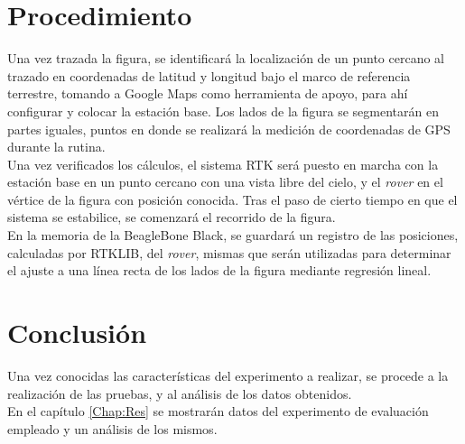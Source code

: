 \section{Procedimiento}

Una vez trazada la figura, se identificará la localización de un punto cercano al trazado en coordenadas de latitud y longitud bajo el marco de referencia terrestre, tomando a Google Maps como herramienta de apoyo, para ahí configurar y colocar la estación base. Los lados de la figura se segmentarán en partes iguales, puntos en donde se realizará la medición de coordenadas de GPS durante la rutina.\\

Una vez verificados los cálculos, el sistema RTK será puesto en marcha con la estación base en un punto cercano con una vista libre del cielo, y el \textit{rover} en el vértice de la figura con posición conocida. Tras el paso de cierto tiempo en que el sistema se estabilice, se comenzará el recorrido de la figura.\\

En la memoria de la BeagleBone Black, se guardará un registro de las posiciones, calculadas por RTKLIB, del \textit{rover}, mismas que serán utilizadas para determinar el ajuste a una línea recta de los lados de la figura mediante regresión lineal.

\section{Conclusión}

Una vez conocidas las características del experimento a realizar, se procede a la realización de las pruebas, y al análisis de los datos obtenidos.\\

En el capítulo \ref{Chap:Res} se mostrarán datos del experimento de evaluación empleado y un análisis de los mismos.